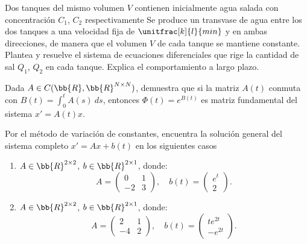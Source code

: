 \begin{ejercicio}\label{ej:5.8}
    Dos tanques del mismo volumen $V$ contienen inicialmente agua salada con concentración $C_1$, $C_2$ respectivamente
    Se produce un transvase de agua entre los dos tanques a una velocidad fija de $\unitfrac[k]{l}{min}$ y en ambas direcciones, de manera que el volumen $V$ de cada tanque se mantiene constante. Plantea y resuelve el sistema de ecuaciones diferenciales que rige la cantidad de sal $Q_1$, $Q_2$ en cada tanque. Explica el comportamiento a largo plazo.
\end{ejercicio}

\begin{ejercicio}\label{ej:5.9}
    Dada $A \in C(\bb{R}, \bb{R}^{N\times N})$, demuestra que si la matriz $A(t)$ conmuta con $B(t) = \displaystyle \int_0^t A(s)~ds$, entonces $\Phi(t) = e^{B(t)}$ es matriz fundamental del sistema $x' = A(t)x$.
\end{ejercicio}

\begin{ejercicio}\label{ej:5.10}
    Por el método de variación de constantes, encuentra la solución general del sistema completo $x' = Ax + b(t)$ en los siguientes casos
    \begin{enumerate}
        \item $A\in \bb{R}^{2\times 2}$, $b\in \bb{R}^{2\times 1}$, donde:
        \[
            A =
            \begin{pmatrix}
                0 & 1\\
                -2 & 3
            \end{pmatrix},
            \quad
            b(t) =
            \begin{pmatrix}
                e^t \\ 2
            \end{pmatrix}.
        \]
        \item $A\in \bb{R}^{2\times 2}$, $b\in \bb{R}^{2\times 1}$, donde:
        \[
            A =
            \begin{pmatrix}
                2 & 1\\
                -4 & 2
            \end{pmatrix},
            \quad
            b(t) =
            \begin{pmatrix}
                te^{2t} \\ -e^{2t}
            \end{pmatrix}.
        \]
    \end{enumerate}
\end{ejercicio}

